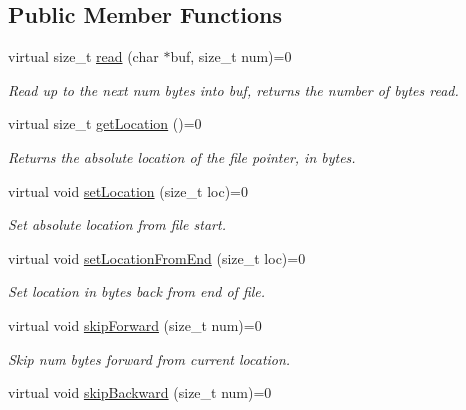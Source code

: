 \subsection*{Public Member Functions}
\begin{DoxyCompactItemize}
\item 
virtual size\_\-t \hyperlink{classBUSBOY_1_1RandomAccessFile_ac8fa9aa05b321b980757a6d80f4eefae}{read} (char $\ast$buf, size\_\-t num)=0
\begin{DoxyCompactList}\small\item\em Read up to the next num bytes into buf, returns the number of bytes read. \item\end{DoxyCompactList}\item 
virtual size\_\-t \hyperlink{classBUSBOY_1_1RandomAccessFile_a51f73555d719157ab2bb6df166dd0074}{getLocation} ()=0
\begin{DoxyCompactList}\small\item\em Returns the absolute location of the file pointer, in bytes. \item\end{DoxyCompactList}\item 
virtual void \hyperlink{classBUSBOY_1_1RandomAccessFile_a8b6fdc1a27e34688d73d167bfa791c30}{setLocation} (size\_\-t loc)=0
\begin{DoxyCompactList}\small\item\em Set absolute location from file start. \item\end{DoxyCompactList}\item 
virtual void \hyperlink{classBUSBOY_1_1RandomAccessFile_ae4a1cbc1c1ffc7405ef11bd9441c5f2b}{setLocationFromEnd} (size\_\-t loc)=0
\begin{DoxyCompactList}\small\item\em Set location in bytes back from end of file. \item\end{DoxyCompactList}\item 
virtual void \hyperlink{classBUSBOY_1_1RandomAccessFile_a45010d12ee4e8c98f5e71273bdf32cf3}{skipForward} (size\_\-t num)=0
\begin{DoxyCompactList}\small\item\em Skip num bytes forward from current location. \item\end{DoxyCompactList}\item 
virtual void \hyperlink{classBUSBOY_1_1RandomAccessFile_a9026d72b47b570f79318839107068420}{skipBackward} (size\_\-t num)=0

\end{DoxyCompactItemize}
